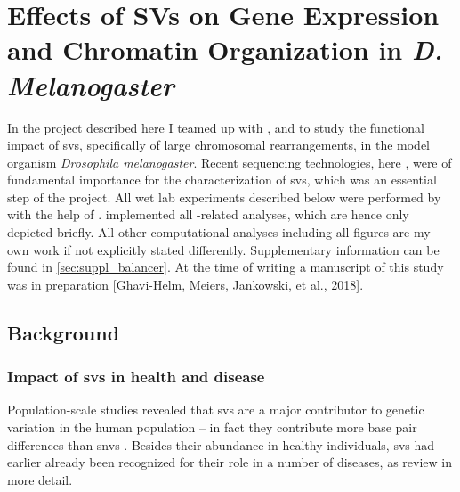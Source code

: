 \chapter{Effects of SVs on Gene Expression and Chromatin
Organization in \texorpdfstring{\textit{D. Melanogaster}}{D. Melanogaster}}
\label{sec:balancer}



In the project described here I teamed up with \yad, \alek and \eileen to study the functional
impact of \acp{sv}, specifically of large chromosomal rearrangements, in the model
organism \textit{Drosophila melanogaster}. Recent
sequencing technologies, here \hic, were of fundamental importance for the characterization
of \acp{sv}, which was an essential step of the project. All wet lab experiments
described below were performed by \yad with the help of \rebecca.
\alek implemented all \hic-related analyses, which are hence
only depicted briefly. All other computational analyses including all figures
are my own work if not explicitly stated differently. Supplementary information
can be found in \cref{sec:suppl_balancer}. At the time of writing a manuscript
of this study was in preparation [Ghavi-Helm, Meiers, Jankowski, et al., 2018].



\section{Background}
\label{sec:balancer_background}


\subsection{Impact of \texorpdfstring{\acsp{sv}}{SVs} in health and disease}

Population-scale studies revealed that \acp{sv} are a major contributor to
genetic variation in the human population \citep{Conrad2010} – in fact they
contribute more base pair differences than \acp{snv} \citep{Sudmant2015}.
Besides their abundance in healthy individuals, \acp{sv} had earlier already
been recognized for their role in a number of diseases, as
\citet{Zhang2009,Weischenfeldt2013,Carvalho2016} review in more detail.

